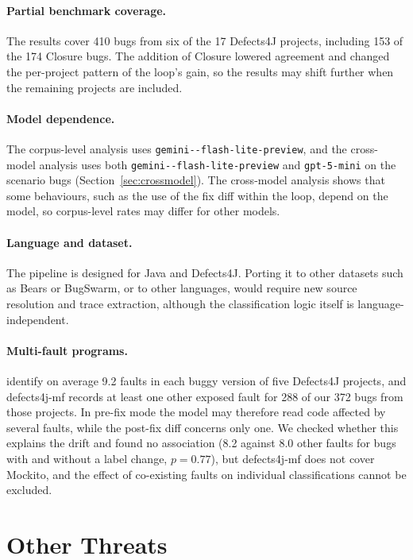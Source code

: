 \documentclass{iutbscthesis}
\newcommand{\modelname}{\texttt{gemini-\allowbreak 3.1-\allowbreak flash-\allowbreak lite-\allowbreak preview}}
\begin{document}
\paragraph{Partial benchmark coverage.} The results cover 410 bugs from six of the 17 Defects4J projects, including 153 of the 174 Closure bugs. The addition of Closure lowered agreement and changed the per-project pattern of the loop's gain, so the results may shift further when the remaining projects are included.

\paragraph{Model dependence.} The corpus-level analysis uses \modelname, and the cross-model analysis uses both \modelname{} and \texttt{gpt-5-mini} on the scenario bugs (Section~\ref{sec:crossmodel}). The cross-model analysis shows that some behaviours, such as the use of the fix diff within the loop, depend on the model, so corpus-level rates may differ for other models.

\paragraph{Language and dataset.} The pipeline is designed for Java and Defects4J. Porting it to other datasets such as Bears or BugSwarm, or to other languages, would require new source resolution and trace extraction, although the classification logic itself is language-independent.

\paragraph{Multi-fault programs.} \textcite{callaghan2024mf} identify on average 9.2 faults in each buggy version of five Defects4J projects, and defects4j-mf records at least one other exposed fault for 288 of our 372 bugs from those projects. In pre-fix mode the model may therefore read code affected by several faults, while the post-fix diff concerns only one. We checked whether this explains the drift and found no association (8.2 against 8.0 other faults for bugs with and without a label change, $p = 0.77$), but defects4j-mf does not cover Mockito, and the effect of co-existing faults on individual classifications cannot be excluded.

\section{Other Threats}
\end{document}
